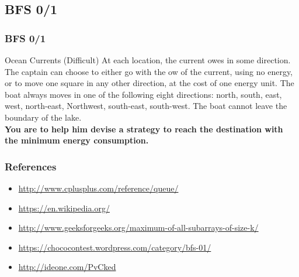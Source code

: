 \documentclass{beamer}
\begin{document}
\subsection{BFS 0/1}
\begin{frame}
\frametitle{BFS 0/1}

\begin{block}{Ocean Currents (Difficult)}
At each location, the current  owes in some direction. The captain can choose to either go with the
 ow of the current, using no energy, or to move one square in any other direction, at the cost of one
energy unit. The boat always moves in one of the following eight directions: north, south, east, west,
north-east, Northwest, south-east, south-west. The boat cannot leave the boundary of the lake.\\

\textbf{You are to help him devise a strategy to reach the destination with the minimum energy consumption.}
\end{block}

\end{frame}
\begin{frame}
\frametitle{ References }
\begin{itemize}
	\item \url{http://www.cplusplus.com/reference/queue/}
	\item \url{https://en.wikipedia.org/}
	\item \url{http://www.geeksforgeeks.org/maximum-of-all-subarrays-of-size-k/}
	\item \url{https://chococontest.wordpress.com/category/bfs-01/}
	\item \url{http://ideone.com/PvCked}
\end{itemize}
\end{frame}
\end{document}
